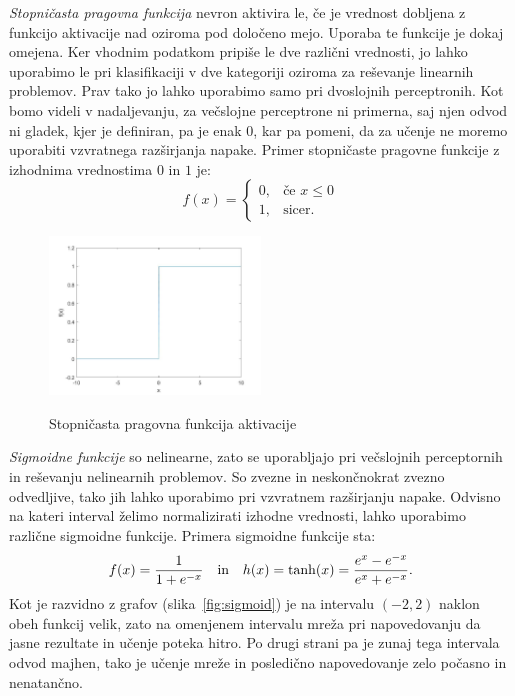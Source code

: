 \documentclass[mat1]{fmfdelo}
\begin{document}
\emph{Stopničasta pragovna funkcija} nevron aktivira le, če je vrednost dobljena z funkcijo aktivacije nad oziroma pod določeno mejo. Uporaba te funkcije je dokaj omejena. Ker vhodnim podatkom pripiše le dve različni vrednosti, jo lahko uporabimo le pri klasifikaciji v dve kategoriji oziroma za reševanje linearnih problemov. Prav tako jo lahko uporabimo samo pri dvoslojnih perceptronih. Kot bomo videli v nadaljevanju, za večslojne perceptrone ni primerna, saj njen odvod ni gladek, kjer je definiran, pa je enak $0$, kar pa pomeni, da za učenje ne moremo uporabiti vzvratnega razširjanja napake. Primer stopničaste pragovne funkcije z izhodnima vrednostima $0$ in $1$ je:
%
\begin{equation*}
f(x)=
    \begin{cases}
      0, & \text{če } x  \leq 0 \\
      1, & \text{sicer.}
    \end{cases} 
\end{equation*}
%
\begin{figure}[!ht]
  \centering
    \includegraphics[width=0.5\textwidth]{step_fun.jpg}
  \label{fig:step}
 \caption{Stopničasta pragovna funkcija aktivacije}
\end{figure}

\emph{Sigmoidne funkcije} so nelinearne, zato se uporabljajo pri večslojnih perceptornih in reševanju nelinearnih problemov. So zvezne in neskončnokrat zvezno odvedljive, tako jih lahko uporabimo pri vzvratnem razširjanju napake. Odvisno na kateri interval želimo normalizirati izhodne vrednosti, lahko uporabimo različne sigmoidne funkcije. Primera sigmoidne funkcije sta: 
%
\begin{equation}
f(x) = \frac{1}{1+e^{-x}} \quad \text{in} \quad h(x) = \tanh(x) = \frac{e^x-e^{-x}}{e^x+e^{-x}} \text.
\end{equation}
%
Kot je razvidno z grafov (slika~\ref{fig:sigmoid}) je na intervalu $(-2,2)$ naklon obeh funkcij velik, zato na omenjenem intervalu mreža pri napovedovanju da jasne rezultate in učenje poteka hitro. Po drugi strani pa je zunaj tega intervala odvod majhen, tako je učenje mreže in posledično napovedovanje zelo počasno in nenatančno. 
\end{document}
